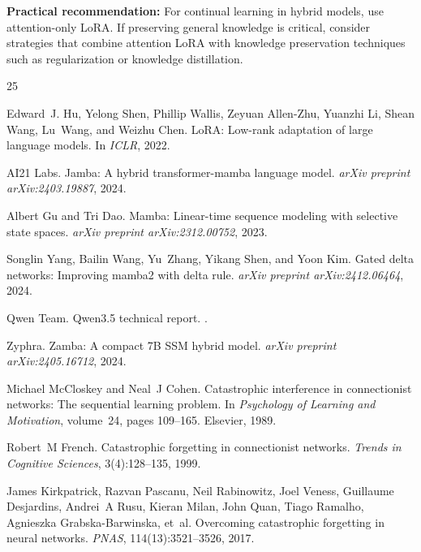 \documentclass{article}
\begin{document}
\textbf{Practical recommendation:} For continual learning in hybrid models, use attention-only LoRA. If preserving general knowledge is critical, consider strategies that combine attention LoRA with knowledge preservation techniques such as regularization or knowledge distillation.



\begin{thebibliography}{25}

Edward~J. Hu, Yelong Shen, Phillip Wallis, Zeyuan Allen-Zhu, Yuanzhi Li, Shean Wang, Lu~Wang, and Weizhu Chen.
\newblock LoRA: Low-rank adaptation of large language models.
\newblock In \emph{ICLR}, 2022.

AI21 Labs.
\newblock Jamba: A hybrid transformer-mamba language model.
\newblock \emph{arXiv preprint arXiv:2403.19887}, 2024.

Albert Gu and Tri Dao.
\newblock Mamba: Linear-time sequence modeling with selective state spaces.
\newblock \emph{arXiv preprint arXiv:2312.00752}, 2023.

Songlin Yang, Bailin Wang, Yu~Zhang, Yikang Shen, and Yoon Kim.
\newblock Gated delta networks: Improving mamba2 with delta rule.
\newblock \emph{arXiv preprint arXiv:2412.06464}, 2024.

Qwen Team.
\newblock Qwen3.5 technical report.
.

Zyphra.
\newblock Zamba: A compact 7B SSM hybrid model.
\newblock \emph{arXiv preprint arXiv:2405.16712}, 2024.

Michael McCloskey and Neal~J Cohen.
\newblock Catastrophic interference in connectionist networks: The sequential learning problem.
\newblock In \emph{Psychology of Learning and Motivation}, volume~24, pages 109--165. Elsevier, 1989.

Robert~M French.
\newblock Catastrophic forgetting in connectionist networks.
\newblock \emph{Trends in Cognitive Sciences}, 3(4):128--135, 1999.

James Kirkpatrick, Razvan Pascanu, Neil Rabinowitz, Joel Veness, Guillaume Desjardins, Andrei~A Rusu, Kieran Milan, John Quan, Tiago Ramalho, Agnieszka Grabska-Barwinska, et~al.
\newblock Overcoming catastrophic forgetting in neural networks.
\newblock \emph{PNAS}, 114(13):3521--3526, 2017.


\end{thebibliography}
\end{document}
